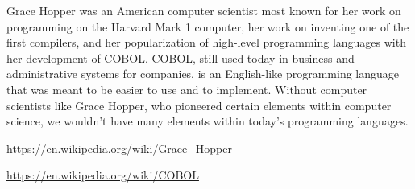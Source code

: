 \documentclass{article}
\begin{document}
\clearpage
\header
Grace Hopper was an American computer scientist most known for her work on programming on the Harvard Mark 1 computer, her work on inventing one of the first compilers, and her popularization of high-level programming languages with her development of COBOL. COBOL, still used today in business and administrative systems for companies, is an English-like programming language that was meant to be easier to use and to implement. Without computer scientists like Grace Hopper, who pioneered certain elements within computer science, we wouldn't have many elements within today's programming languages.

\item[]\url{https://en.wikipedia.org/wiki/Grace_Hopper}
\item[]\url{https://en.wikipedia.org/wiki/COBOL}
\end{document}
